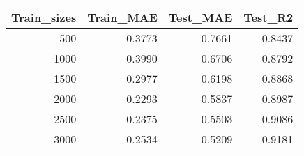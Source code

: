 \begin{tabular}{rrrr}
\toprule
Train_sizes & Train_MAE & Test_MAE & Test_R2 \\
\midrule
500 & 0.3773 & 0.7661 & 0.8437 \\
1000 & 0.3990 & 0.6706 & 0.8792 \\
1500 & 0.2977 & 0.6198 & 0.8868 \\
2000 & 0.2293 & 0.5837 & 0.8987 \\
2500 & 0.2375 & 0.5503 & 0.9086 \\
3000 & 0.2534 & 0.5209 & 0.9181 \\
\bottomrule
\end{tabular}
